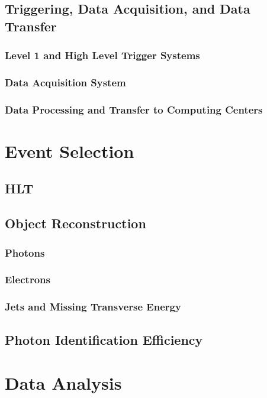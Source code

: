 \documentclass[12pt, letterpaper]{report}
\begin{document}
\section{Triggering, Data Acquisition, and Data Transfer}
\subsection{Level 1 and High Level Trigger Systems}
\subsection{Data Acquisition System}
\subsection{Data Processing and Transfer to Computing Centers}

\chapter{Event Selection}
\section{HLT}
\section{Object Reconstruction}
\subsection{Photons}
\subsection{Electrons}
\subsection{Jets and Missing Transverse Energy}
\section{Photon Identification Efficiency}

\chapter{Data Analysis}
\end{document}
